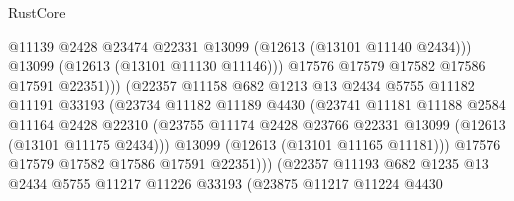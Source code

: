 \begin{lexlean}{RustCore}
\begin{coremodule}
                                      @11139
                                      @2428
                                      @23474
                                      @22331
                                      @13099
                                      (@12613 (@13101 @11140 @2434)))
                                    @13099
                                    (@12613 (@13101 @11130 @11146)))
                                  @17576
                                  @17579
                                  @17582
                                  @17586
                                  @17591
                                  @22351)))
                            (@22357
                              @11158
                              @682
                              @1213
                              @13
                              @2434
                              @5755
                              @11182
                              @11191
                              @33193
                              (@23734
                                @11182
                                @11189
                                @4430
                                (@23741
                                  @11181
                                  @11188
                                  @2584
                                  @11164
                                  @2428
                                  @22310
                                  (@23755
                                    @11174
                                    @2428
                                    @23766
                                    @22331
                                    @13099
                                    (@12613 (@13101 @11175 @2434)))
                                  @13099
                                  (@12613 (@13101 @11165 @11181)))
                                @17576
                                @17579
                                @17582
                                @17586
                                @17591
                                @22351)))
                          (@22357
                            @11193
                            @682
                            @1235
                            @13
                            @2434
                            @5755
                            @11217
                            @11226
                            @33193
                            (@23875
                              @11217
                              @11224
                              @4430

\end{coremodule}
\end{lexlean}
